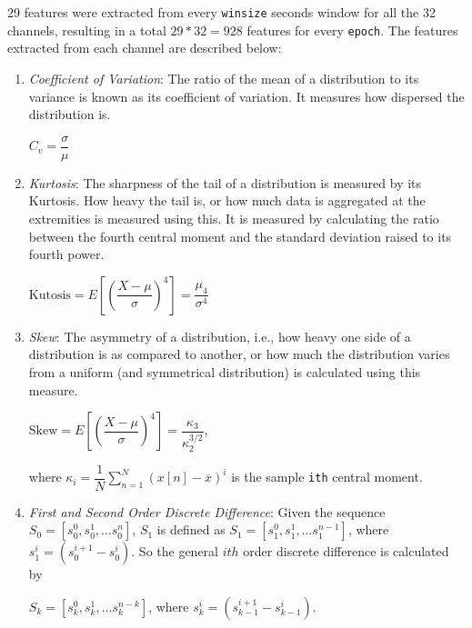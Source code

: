 29 features were extracted from every \texttt{winsize} seconds window for all the 32 channels, resulting in a total $29 * 32 = 928$ features for every \texttt{epoch}. The features extracted from each channel are described below:
\begin{enumerate}

\item \emph{Coefficient of Variation}: The ratio of the mean of a distribution to its variance is known as its coefficient of variation. It measures how dispersed the distribution is.
\begin{tightcenter}
$C_{v}=\dfrac {\sigma }{\mu }$
\end{tightcenter}

\item \emph{Kurtosis}: The sharpness of the tail of a distribution is measured by its Kurtosis. How heavy the tail is, or how much data is aggregated at the extremities is measured using this. It is measured by calculating the ratio between the fourth central moment and the standard deviation raised to its fourth power.
\begin{tightcenter}
$\text{Kutosis} = E\left[ \left( \dfrac {X-\mu }{\sigma }\right) ^{4}\right]
 = \dfrac{\mu_4}{\sigma^4}$
\end{tightcenter}

\item \emph{Skew}: The asymmetry of a distribution, i.e., how heavy one side of a distribution is as compared to another, or how much the distribution varies from a uniform (and symmetrical distribution) is calculated using this measure.
\begin{tightcenter}
$\text{Skew} = {E\left[ \left( \dfrac {X-\mu }{\sigma }\right) ^{4}\right]} = {\dfrac {\kappa_{3}}{\kappa_{2}^{3/2}}}$,
\end{tightcenter}
where ${\kappa_i = \dfrac {1}{N}\sum ^{N}_{n=1}\left( x\left[ n\right] -\overline {x}\right) ^{i}}$ is the sample \texttt{ith} central moment.

\item \emph{First and Second Order Discrete Difference}: Given the sequence ${S_0 = [s_0^0, s_0^1, \ldots s_0^n]}$, ${S_1}$ is defined as ${S_1 = [s_1^0, s_1^1, \ldots s_1^{n-1}]}$, where $s_1^i = (s_0^{i + 1} - s_0^i)$. So the general $ith$ order discrete difference is calculated by
\begin{tightcenter}
$S_k = [s_k^0, s_k^1, \ldots s_k^{n - k}]$, where $s_k^i = (s_{k-1}^{i + 1} - s_{k - 1}^i)$.
\end{tightcenter}


\end{enumerate}
